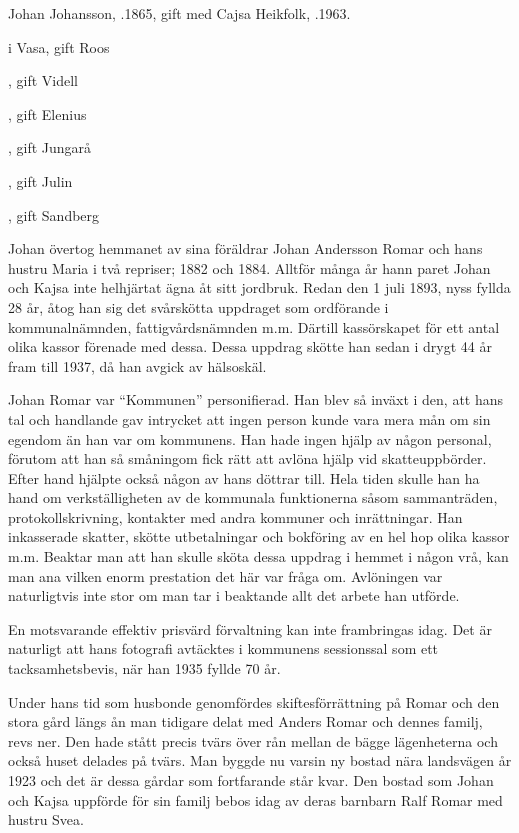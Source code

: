 Johan Johansson, .1865, gift med Cajsa Heikfolk, .1963.
\begin{jhchildren}
  \item {} i Vasa, gift Roos
  \item {}, gift Videll
  \item {}, gift Elenius
  \item {}, gift Jungarå
  \item {}
  \item {}, gift Julin
  \item {}, gift Sandberg
\end{jhchildren}
Johan övertog hemmanet av sina föräldrar Johan Andersson Romar och hans hustru Maria i två repriser;  1882 och 1884. Alltför många år hann paret Johan och Kajsa inte helhjärtat ägna åt sitt jordbruk. Redan den 1 juli 1893, nyss fyllda 28 år, åtog han sig det svårskötta uppdraget som ordförande i kommunalnämnden, fattigvårdsnämnden m.m. Därtill kassörskapet för ett antal olika kassor förenade med dessa. Dessa uppdrag skötte han sedan i drygt 44 år fram till 1937, då han avgick av hälsoskäl.

Johan Romar var ``Kommunen'' personifierad. Han blev så inväxt i den, att hans tal och handlande gav intrycket att ingen person kunde vara mera mån om sin egendom än han var om kommunens. Han hade ingen hjälp av någon personal, förutom  att han så småningom fick rätt att avlöna hjälp vid skatteuppbörder. Efter hand hjälpte också någon av hans döttrar till. Hela tiden skulle han ha hand om verkställigheten av de kommunala funktionerna såsom sammanträden, protokollskrivning, kontakter med andra kommuner och inrättningar. Han inkasserade skatter, skötte utbetalningar och bokföring av en hel hop olika kassor m.m. Beaktar man att han skulle sköta dessa uppdrag i hemmet i någon vrå, kan man ana vilken enorm prestation det här var fråga om. Avlöningen var naturligtvis inte stor om man tar i beaktande allt det arbete han utförde.

En motsvarande effektiv prisvärd förvaltning kan inte frambringas idag. Det är naturligt att hans fotografi avtäcktes i kommunens sessionssal som ett tacksamhetsbevis, när han 1935 fyllde 70 år.

Under hans tid som husbonde genomfördes skiftesförrättning på Romar och den stora gård längs ån man tidigare delat med Anders Romar och dennes familj, revs ner. Den hade stått precis tvärs över rån mellan de bägge lägenheterna och också huset delades på tvärs. Man byggde nu varsin ny bostad nära landsvägen år 1923 och det är dessa gårdar som fortfarande står kvar. Den bostad som Johan och Kajsa uppförde för sin familj bebos idag av deras barnbarn Ralf Romar med hustru Svea.

